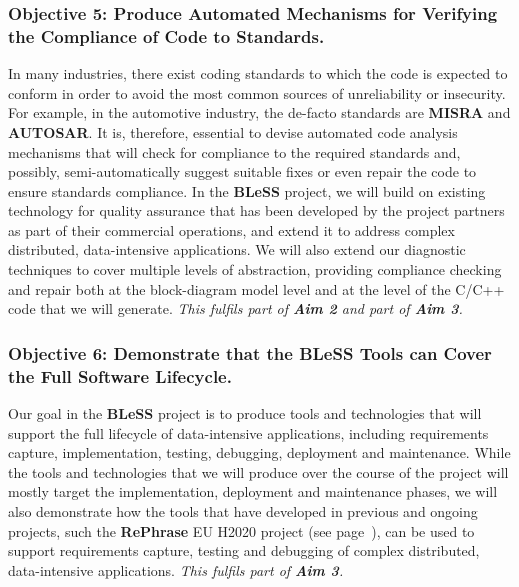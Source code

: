 \documentclass[a4paper,11pt]{article}
\newcommand{\project}[1]{\textbf{#1}\xspace}
\newcommand{\BLESS}{\project{BLeSS}}
\newcommand{\TheProject}{\BLESS}
\begin{document}
\subsubsection*{Objective 5: Produce Automated Mechanisms for Verifying the Compliance of Code to Standards.}
\vspace{-6pt}

In many industries, there exist coding standards to which the code is expected to conform in order to
avoid the most common sources of unreliability or insecurity. For example, in the automotive industry, the
de-facto standards are \textbf{MISRA} and \textbf{AUTOSAR}. It is, therefore, essential to devise automated
code analysis mechanisms that will check for compliance to the required standards and, possibly, semi-automatically suggest suitable fixes or even 
repair the code to ensure standards compliance. In the \TheProject{} project, we will build on existing technology
for quality assurance that has been developed by the project partners as part of their commercial operations,
and extend it to address complex distributed, data-intensive applications. We will also extend our diagnostic techniques to
cover multiple levels of abstraction, providing
compliance checking and repair both at the block-diagram model level and at the level of the C/C++ code that we
will generate.
\newline
\emph{This fulfils part of \textbf{Aim 2} and part of \textbf{Aim 3}.}



\subsubsection*{Objective 6: Demonstrate that the \TheProject{} Tools can Cover the Full Software Lifecycle.}
\vspace{-6pt}

Our goal in the \TheProject{} project is to produce tools and technologies that will support the full
lifecycle of data-intensive applications, including requirements capture, implementation, testing, debugging,
deployment and maintenance. While the tools and technologies that we will produce over the course of the project
will mostly  target the implementation, deployment and maintenance phases, we will also demonstrate how the tools
that have developed in previous and ongoing projects, such the \textbf{RePhrase} EU H2020 project (see page~\pageref{projects}), can be used to support
requirements capture, testing and debugging of complex distributed, data-intensive applications. 
\newline
\emph{This fulfils part of \textbf{Aim 3}.}
\end{document}
